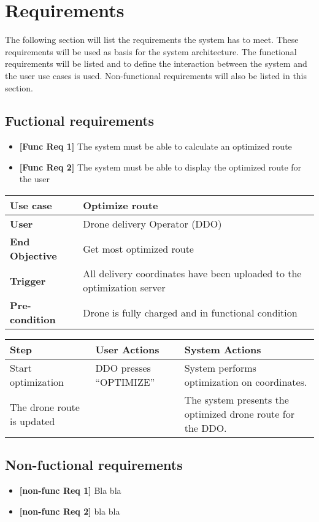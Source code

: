
\chapter{Requirements}

The following section will list the requirements the system has to meet. These requirements will be used as basis for the system architecture. The functional requirements will be listed and to define the interaction between the system and the user use cases is used. Non-functional requirements will also be listed in this section. 

\section{Fuctional requirements}
\begin{itemize}
	\item \textbf{[Func Req 1]} The system must be able to calculate an optimized route
	\item \textbf{[Func Req 2]} The system must be able to display the optimized route for the user
\end{itemize}

\begin{table}[H]
	\begin{tabular}{|l|l|}
		\hline
		\cellcolor[HTML]{EFEFEF} \textbf{Use case}  & \cellcolor[HTML]{EFEFEF} \textbf{Optimize route}\\ \hline
		\cellcolor[HTML]{EFEFEF} \textbf{User} &  Drone delivery Operator (DDO) \\ \hline
		\cellcolor[HTML]{EFEFEF} \textbf{End Objective} &  Get most optimized route\\ \hline
		\cellcolor[HTML]{EFEFEF} \textbf{Trigger} & All delivery coordinates have been uploaded to the optimization server \\ \hline 
		\cellcolor[HTML]{EFEFEF} \textbf{Pre-condition} & Drone is fully charged and in functional condition \\ \hline
	\end{tabular}
\end{table}

\begin{table}[H]
	\begin{tabular}{|l|l|l|}
		\hline
		\cellcolor[HTML]{EFEFEF} \textbf{Step}  & \cellcolor[HTML]{EFEFEF} \textbf{User Actions}   & \cellcolor[HTML]{EFEFEF} \textbf{System Actions} \\ \hline
		\cellcolor[HTML]{EFEFEF} Start optimization  &  DDO presses “OPTIMIZE”   &  \makecell{ System performs \\ optimization on coordinates.} \\ \hline
		\cellcolor[HTML]{EFEFEF} The drone route is updated   &     &  The system presents the optimized drone route for the DDO.  \\ \hline
	\end{tabular}
\end{table}


\section{Non-fuctional requirements}
\begin{itemize}
	\item \textbf{[non-func Req 1]} Bla bla
	\item \textbf{[non-func Req 2]} bla bla
\end{itemize}